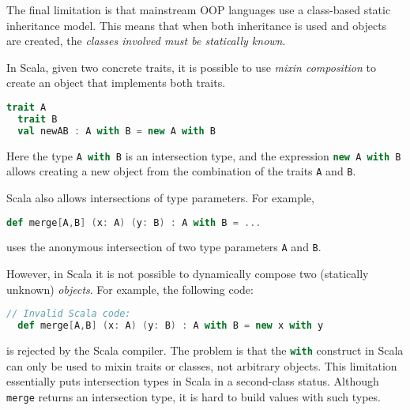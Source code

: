 The final limitation is that mainstream OOP languages use a class-based static
inheritance model. This means that when both inheritance is used and objects are
created, the \emph{classes involved must be statically known}.
\begin{comment}
Intersection types date back as early as Coppo et al.'s
work~\cite{coppo1981functional}. Since then researchers have studied
intersection types, and some languages have adopted them in one form or another.

In Java, for example,
\begin{lstlisting}[language=java]
  interface AwithB extends A, B {}
\end{lstlisting}
introduces a new interface \lstinline$AwithB$ that satisfies the interface of
both \lstinline{A} and \lstinline{B}. 
\end{comment}
In Scala, given two concrete traits, it is
possible to use \textit{mixin composition} to create an object that implements
both traits.
\begin{lstlisting}[language=scala]
  trait A
  trait B
  val newAB : A with B = new A with B
\end{lstlisting}
\noindent Here the type \lstinline[language=scala]{A with B} is an intersection type,
and the expression \lstinline[language=scala]{new A with B} allows creating a new
object from the combination of the traits \lstinline{A} and
\lstinline{B}.

Scala also allows intersections of type parameters. For example,
\begin{lstlisting}[language=scala]
  def merge[A,B] (x: A) (y: B) : A with B = ...
\end{lstlisting}
uses the anonymous intersection of two type parameters \lstinline{A} and
\lstinline{B}.

However, in Scala it is not possible to dynamically compose two
(statically unknown) \emph{objects}. For
example, the following code:
\begin{lstlisting}[language=scala]
  // Invalid Scala code:
  def merge[A,B] (x: A) (y: B) : A with B = new x with y
\end{lstlisting}
is rejected by the Scala compiler. The problem is that the \lstinline[language=scala]$with$
construct in Scala can only be used to mixin traits or classes, not
arbitrary objects. This limitation essentially puts intersection types in Scala
in a second-class status. Although \lstinline{merge} returns an intersection
type, it is hard to build values with such types.

